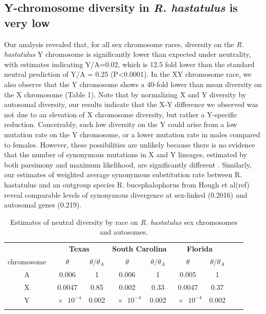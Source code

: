 \documentclass[9pt,twocolumn,twoside]{gsajnl}
\begin{document}
\subsection*{Y-chromosome diversity in \textit{R. hastatulus} is very low}
Our analysis revealed that, for all sex chromosome races, diversity on the \textit{R. hastatulus} Y chromosome is significantly lower than expected under neutrality, with estimates indicating Y/A=0.02, which is 12.5 fold lower than the standard neutral prediction of Y/A = 0.25 (P<0.0001). In the XY chromosome race, we also observe that the Y chromosome shows a 40-fold lower than mean diversity on the X chromosome (Table 1). Note that by normalizing X and Y diversity by autosomal diversity, our results indicate that the X-Y difference we observed was not due to an elevation of X chromosome diversity, but rather a Y-specific reduction. Conceivably, such low diversity on the Y could arise from a low mutation rate on the Y chromosome, or a lower mutation rate in males compared to females. However, these possibilities are unlikely because there is no evidence that the number of synonymous mutations in X and Y lineages, estimated by both parsimony and maximum likelihood, are significantly different \citep{hough2014}. Similarly, our estimates of weighted average synonymous substitution rate between R. hastatulus and an outgroup species R. bucephalophorus from Hough et al(ref) reveal comparable levels of synonymous divergence at sex-linked (0.2016) and autosomal genes (0.219). 

\begin{table}[t!]
\centering
\caption{Estimates of neutral diversity by race on \textit{R. hastatulus} sex chromosomes and autosomes.}
\begin{tabular}{ccccccccc}
\textbf{} & \multicolumn{2}{c}{\textbf{Texas}} & \multicolumn{2}{c}{\textbf{South Carolina}} & \multicolumn{2}{c}{\textbf{Florida}} \\
chromosome & $\theta$ & $\theta/\theta_{A}$ & $\theta$ & $\theta/\theta_{A}$ & $\theta$ & $\theta/\theta_{A}$ \\
\midrule
A & 0.006 & 1 & 0.006 & 1 & 0.005 & 1 \\
X & 0.0047 & 0.85 & 0.002 & 0.33 & 0.0047 & 0.37 \\
Y & $\num{e-4}$ & 0.002 & $\num{e-4}$ & 0.002 & $\num{e-4}$ & 0.002 \\
\addlinespace

\bottomrule
\end{tabular}
\end{table}
\end{document}
